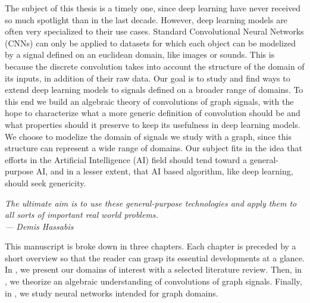 The subject of this thesis is a timely one, since deep learning have never received so much spotlight than in the last decade. However, deep learning models are often very specialized to their use cases. Standard Convolutional Neural Networks (CNNs) can only be applied to datasets for which each object can be modelized by a signal defined on an euclidean domain, like images or sounds. This is because the discrete convolution takes into account the structure of the domain of its inputs, in addition of their raw data. Our goal is to study and find ways to extend deep learning models to signals defined on a broader range of domains. To this end we build an algebraic theory of convolutions of graph signals, with the hope to characterize what a more generic definition of convolution should be and what properties should it preserve to keep its usefulness in deep learning models. We choose to modelize the domain of signals we study with a graph, since this structure can represent a wide range of domains. Our subject fits in the idea that efforts in the Artificial Intelligence (AI) field should tend toward a general-purpose AI, and in a lesser extent, that AI based algorithm, like deep learning, should seek genericity.

\begin{displayquote}
\begin{flushright}
\emph{The ultimate aim is to use these general-purpose technologies and apply them to all sorts of important real world problems.\\
--- Demis Hassabis}
\end{flushright}
\end{displayquote}

This manuscript is broke down in three chapters. Each chapter is preceded by a short overview so that the reader can grasp its essential developments at a glance. In , we present our domains of interest with a selected literature review. Then, in , we theorize an algebraic understanding of convolutions of graph signals. Finally, in , we study neural networks intended for graph domains.


